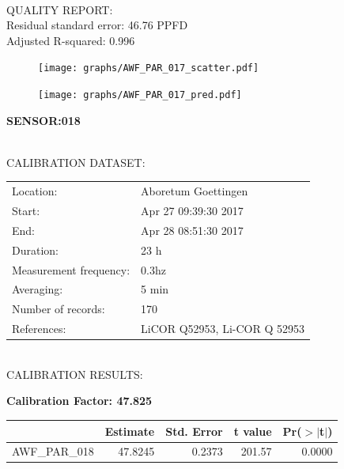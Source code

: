 \documentclass[oneside]{report}
\begin{document}
\hrulefill\\
QUALITY REPORT:\\
Residual standard error: 46.76 PPFD\\
Adjusted R-squared: 0.996



\begin{figure}[H]
  \centering
  \texttt{[image: graphs/AWF\_PAR\_017\_scatter.pdf]}
\end{figure}




\begin{figure}[H]
  \centering
  \texttt{[image: graphs/AWF\_PAR\_017\_pred.pdf]}
\end{figure}

\pagebreak


\begin{center}
\large{\textbf{SENSOR:018}}\\
\end{center}

\hrulefill\\
CALIBRATION DATASET:\\
\begin{table}[h!]
  \centering
  \label{tab:table1}
  \begin{tabular}{ll}
    Location: & Aboretum Goettingen\\ 
    
    
    Start:  & Apr 27 09:39:30 2017 \\
    End:   & Apr 28 08:51:30 2017\\ 
    Duration: & 23 h\\
    Measurement frequency: & 0.3hz\\
    Averaging:  &5 min\\
    Number of records: & 170 \\
    References: & LiCOR Q52953, Li-COR Q 52953 \\
  \end{tabular}
\end{table}

\hrulefill\\
CALIBRATION RESULTS:\\


\begin{center}
\textbf{\large{Calibration Factor: 47.825}}\\
\end{center}
\begin{table}[ht]
\centering
\begin{tabular}{rrrrr}
  \hline
 & Estimate & Std. Error & t value & Pr($>$$|$t$|$) \\ 
  \hline
AWF\_PAR\_018 & 47.8245 & 0.2373 & 201.57 & 0.0000 \\ 
   \hline
\end{tabular}
\end{table}
\end{document}
